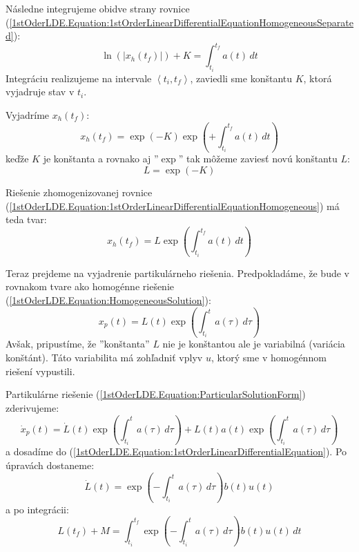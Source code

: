 \documentclass[a4paper, 10pt, ]{article}
\theoremstyle{definition}
\begin{document}
\noindent Následne integrujeme obidve strany rovnice (\ref{1stOderLDE.Equation:1stOrderLinearDifferentialEquationHomogeneousSeparated}):
\begin{equation}
    \label{1stOrderLDE.Equation:HomogeneousIntegral}
    \ln \left( |x_h(t_f)| \right) + K = \int_{t_i}^{t_f} a(t) \, dt
\end{equation}
Integráciu realizujeme na intervale $\left< t_i, t_f \right>$, zaviedli sme konštantu $K$, ktorá vyjadruje stav v $t_i$.

Vyjadríme $x_h(t_f)$:
\begin{equation}
    x_h(t_f) = \exp(-K) \exp \left( + \int_{t_i}^{t_f} a(t) \, dt \right)
\end{equation}
keďže $K$ je konštanta a rovnako aj ''$\exp$'' tak môžeme zaviesť novú konštantu $L$:
\begin{equation}
    L = \exp(-K)
\end{equation}

Riešenie zhomogenizovanej rovnice (\ref{1stOderLDE.Equation:1stOrderLinearDifferentialEquationHomogeneous}) má teda tvar:
\begin{equation}
    \label{1stOderLDE.Equation:HomogeneousSolution}
    x_h(t_f) = L \exp \left( \int_{t_i}^{t_f} a(t) \, dt \right)
\end{equation}

Teraz prejdeme na vyjadrenie partikulárneho riešenia. Predpokladáme, že bude v rovnakom tvare ako homogénne riešenie (\ref{1stOderLDE.Equation:HomogeneousSolution}):
\begin{equation}
    \label{1stOderLDE.Equation:ParticularSolutionForm}
    x_p(t) = L(t) \exp \left( \int_{t_i}^{t} a(\tau) \, d\tau \right)
\end{equation}
Avšak, pripustíme, že ''konštanta'' $L$ nie je konštantou ale je variabilná (variácia konštánt). Táto variabilita má zohľadniť vplyv $u$, ktorý sme v homogénnom riešení vypustili.

Partikulárne riešenie (\ref{1stOderLDE.Equation:ParticularSolutionForm}) zderivujeme:
\begin{equation}
    \dot{x}_p(t) = 
    \dot{L}(t) \exp \left( \int_{t_i}^{t} a(\tau) \, d\tau \right) + 
    L(t) a(t) \exp \left( \int_{t_i}^{t} a(\tau) \, d\tau \right)
\end{equation}
a dosadíme do (\ref{1stOderLDE.Equation:1stOrderLinearDifferentialEquation}). Po úpravách dostaneme:
\begin{equation}
    \dot{L}(t)  = 
    \exp \left( -\int_{t_i}^{t} a(\tau) \, d\tau \right) b(t) u(t)
\end{equation}
a po integrácii:
\begin{equation}
    \label{1stOderLDE.Equation:ConstantVariation}
    L(t_f) + M = \int_{t_i}^{t_f} \exp \left( -\int_{t_i}^{t} a(\tau) \, d\tau \right) b(t) u(t) \, dt
\end{equation}
\end{document}
